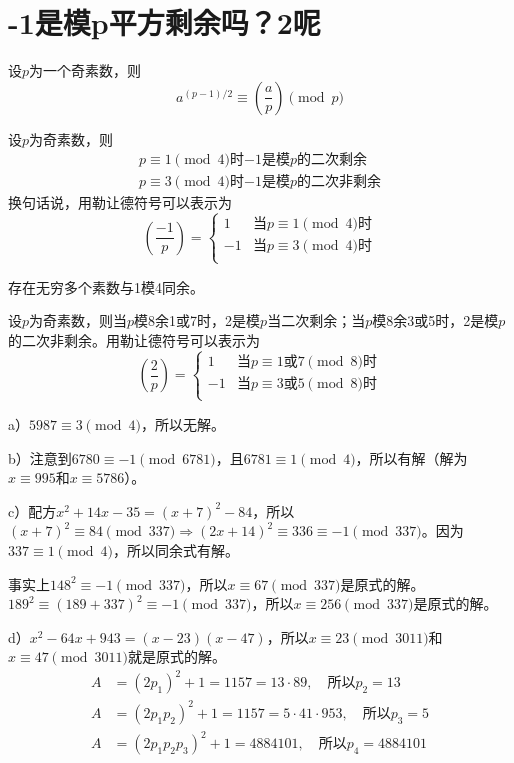 \chapter{-1是模p平方剩余吗？2呢}
\begin{theorem}[欧拉准则]
设$p$为一个奇素数，则
\[a^{(p-1)/2}\equiv\left(\frac{a}{p}\right)\pmod p\]
\end{theorem}
\begin{theorem}
设$p$为奇素数，则
\begin{gather*}
p\equiv1\pmod4\text{时$-1$是模$p$的二次剩余} \\
p\equiv3\pmod4\text{时$-1$是模$p$的二次非剩余}
\end{gather*}
换句话说，用勒让德符号可以表示为
\[\left(\frac{-1}{p}\right)=
\begin{cases}
    1&\text{当$p\equiv1\pmod4$时}\\
    -1&\text{当$p\equiv3\pmod4$时}\\
\end{cases}\]
\end{theorem}
\begin{theorem}[模4余1素数定理]
存在无穷多个素数与1模4同余。
\end{theorem}
\begin{theorem}
设$p$为奇素数，则当$p$模8余1或7时，2是模$p$当二次剩余；当$p$模8余3或5时，2是模$p$的二次非剩余。用勒让德符号可以表示为
\[\left(\frac{2}{p}\right)=
\begin{cases}
    1&\text{当$p\equiv1$或$7\pmod8$时}\\
    -1&\text{当$p\equiv3$或$5\pmod8$时}\\
\end{cases}\]
\end{theorem}
%
\exercise a）$5987\equiv3\pmod4$，所以无解。\par
b）注意到$6780\equiv-1\pmod{6781}$，且$6781\equiv1\pmod4$，所以有解（解为$x\equiv995$和$x\equiv5786$）。\par
c）配方$x^2+14x-35=(x+7)^2-84$，所以$(x+7)^2\equiv 84\pmod{337}\Rightarrow (2x+14)^2\equiv336\equiv-1\pmod{337}$。因为$337\equiv1\pmod4$，所以同余式有解。\par
事实上$148^2\equiv-1\pmod{337}$，所以$x\equiv67\pmod{337}$是原式的解。$189^2\equiv(189+337)^2\equiv-1\pmod{337}$，所以$x\equiv256\pmod{337}$是原式的解。\par
d）$x^2-64x+943=(x-23)(x-47)$，所以$x\equiv23\pmod{3011}$和$x\equiv47\pmod{3011}$就是原式的解。
%
\exercise 
\begin{align*}
A&=(2p_1)^2+1=1157=13\cdot89,\quad \text{所以}p_2=13 \\
A&=(2p_1p_2)^2+1=1157=5\cdot41\cdot953,\quad \text{所以}p_3=5 \\
A&=(2p_1p_2p_3)^2+1=4884101,\quad \text{所以}p_4=4884101
\end{align*}
